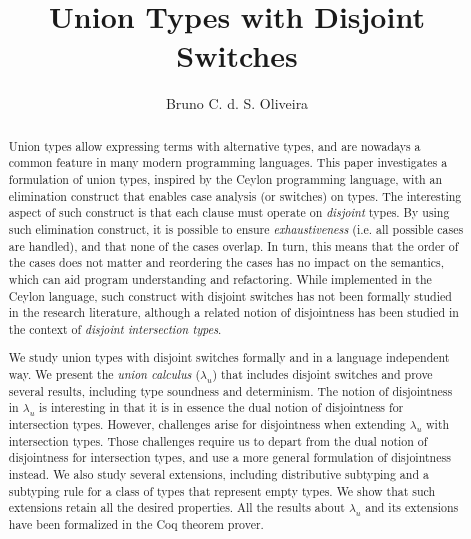 \documentclass[acmsmall,review,anonymous,screen]{acmart}\settopmatter{printfolios=true,printccs=false,printacmref=false}
\title{Union Types with Disjoint Switches}
\author{Bruno C. d. S. Oliveira}
\affiliation{
  \institution{The University of Hong Kong}            %
}
\newcommand{\name}{$\lambda_{u}$\xspace}
\newcommand{\cal}{$\lambda_{u}$\xspace}
\begin{document}
\begin{abstract}
Union types allow expressing terms with alternative types,
and are nowadays a common feature in many modern programming
languages.
This paper investigates a formulation of union types,
inspired by the Ceylon programming language, with an elimination
construct that enables case analysis (or switches) on types.  The
interesting aspect of such construct is that each clause must operate
on \emph{disjoint} types. By using such elimination construct, it is
possible to ensure \emph{exhaustiveness} (i.e. all possible cases are
handled), and that none of the cases overlap. In turn, this means that
the order of the cases does not matter and reordering the cases has no
impact on the semantics, which can aid program understanding and
refactoring. While implemented in the Ceylon language, such construct
with disjoint switches has not been formally studied in the research
literature, although a related notion of disjointness has been studied
in the context of \emph{disjoint intersection types}.

We study union types with disjoint switches formally and in a language
independent way.  We present the \emph{union calculus} (\cal) that
includes disjoint switches and prove several results, including type
soundness and determinism. The notion of disjointness in \cal
is interesting in that it is in essence the dual notion of disjointness
for intersection types.  However, challenges arise for
disjointness when extending \name with intersection types. Those challenges
require us to depart from the dual notion of disjointness for intersection types,
and use a more general formulation of disjointness instead. We also
study several extensions, including
distributive subtyping and a subtyping rule for a class of types that represent empty
types. We show that such extensions retain all the
desired properties. All the results about \cal and its extensions have
been formalized in the Coq theorem prover.
\end{abstract}

\begin{comment}
    With advance types
such as intersection types and union types, it has become a challenge
to define a robust, type-safe, coherent and deterministic type
system. One often has to compromise on one property to attain
another. Union types with pattern matching on types add significant
expressive power in programming language. Function overloading can
simply be expressed in a single function with the help of union types
and case analysis on types. Intersection types incorporate many
interesting and advance features that are not easy to implement in
classical OOP model.  This study proposes a novel calculus with all
aforementioned properties for pattern matching with union types and
intersection types. The calculus proposed in this study is named as
\cal.  Outline idea in \cal is to allow only non-overlapping or
disjoint types in case expressions.
\end{comment}
\end{document}
